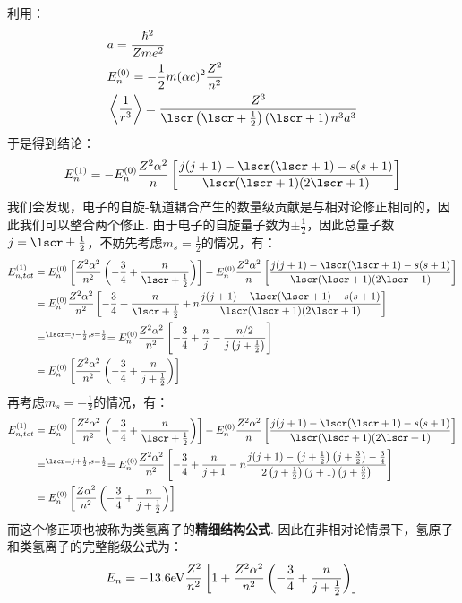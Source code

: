 利用：
\begin{align*}
& a = \frac{\hh^{2}}{Zme^{2}} \\
& E_{n}^{(0)} = -\frac{1}{2}m(\al c)^{2}\frac{Z^{2}}{n^{2}} \\
& \avg{\frac{1}{r^{3}}} = \frac{Z^{3}}{\lscr\br{\lscr+\frac{1}{2}}\br{\lscr+1}n^{3}a^{3}}
\end{align*}
于是得到结论：
\[
E_{n}^{(1)} = -E_{n}^{(0)}\frac{Z^{2}\al^{2}}{n}\mbr{\frac{j(j+1) - \lscr(\lscr+1)-s(s+1)}{\lscr(\lscr+1)(2\lscr+1)}}
\]
我们会发现，电子的自旋-轨道耦合产生的数量级贡献是与相对论修正相同的，因此我们可以整合两个修正. 由于电子的自旋量子数为\(\pm\frac{1}{2}\)，因此总量子数\(j=\lscr\pm\frac{1}{2}\)，不妨先考虑\(m_{s}=\frac{1}{2}\)的情况，有：
\begin{align*}
E_{n,tot}^{(1)} 
& = E_{n}^{(0)}\mbr{\frac{Z^{2}\al^{2}}{n^{2}}\br{-\frac{3}{4} + \frac{n}{\lscr+\frac{1}{2}}}}-E_{n}^{(0)}\frac{Z^{2}\al^{2}}{n}\mbr{\frac{j(j+1) - \lscr(\lscr+1)-s(s+1)}{\lscr(\lscr+1)(2\lscr+1)}} \\
& = E_{n}^{(0)}\frac{Z^{2}\al^{2}}{n^{2}}\mbr{-\frac{3}{4} + \frac{n}{\lscr+\frac{1}{2}} + n\frac{j(j+1) - \lscr(\lscr+1)-s(s+1)}{\lscr(\lscr+1)(2\lscr+1)}} \\
& =^{\lscr=j-\frac{1}{2},s=\frac{1}{2}}= E_{n}^{(0)}\frac{Z^{2}\al^{2}}{n^{2}}\mbr{-\frac{3}{4} + \frac{n}{j} - \frac{n/2}{j\br{j+\frac{1}{2}}}} \\
& = E_{n}^{(0)}\mbr{\frac{Z^{2}\al^{2}}{n^{2}}\br{-\frac{3}{4} + \frac{n}{j+\frac{1}{2}}}}
\end{align*}
再考虑\(m_{s}=-\frac{1}{2}\)的情况，有：
\begin{align*}
E_{n,tot}^{(1)}
& =  E_{n}^{(0)}\mbr{\frac{Z^{2}\al^{2}}{n^{2}}\br{-\frac{3}{4} + \frac{n}{\lscr+\frac{1}{2}}}}-E_{n}^{(0)}\frac{Z^{2}\al^{2}}{n}\mbr{\frac{j(j+1) - \lscr(\lscr+1)-s(s+1)}{\lscr(\lscr+1)(2\lscr+1)}} \\
& =^{\lscr=j+\frac{1}{2},s=\frac{1}{2}}= E_{n}^{(0)}\frac{Z^{2}\al^{2}}{n^{2}}\mbr{-\frac{3}{4} + \frac{n}{j+1} - n\frac{j(j+1)-\br{j+\frac{1}{2}}\br{j+\frac{3}{2}}-\frac{3}{4}}{2\br{j+\frac{1}{2}}\br{j+1}\br{j+\frac{3}{2}}}} \\
& = E_{n}^{(0)}\mbr{\frac{Z\al^{2}}{n^{2}}\br{-\frac{3}{4} + \frac{n}{j+\frac{1}{2}}}}
\end{align*}
而这个修正项也被称为类氢离子的\textbf{精细结构公式}. 因此在非相对论情景下，氢原子和类氢离子的完整能级公式为：
\[
E_{n} = -13.6\mathrm{eV}\frac{Z^{2}}{n^{2}}\left[{1 + \frac{Z^{2}\alpha^{2}}{n^{2}}\left({-\frac{3}{4}+\frac{n}{j+\frac{1}{2}}}\right)}\right]
\]

